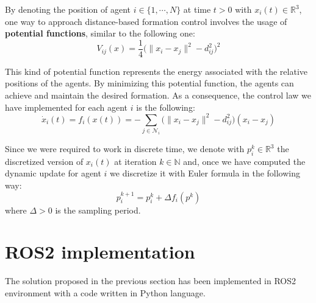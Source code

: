 \documentclass[a4paper,11pt,oneside]{book}
\begin{document}
By denoting the position of agent $i \in \{1, \cdots, N\}$ at time $t>0$ with $x_i(t) \in \mathbb{R}^3$, one way to approach distance-based formation control involves the usage of \textbf{potential functions}, similar to the following one:
\begin{equation}
V_{ij}(x)  = \frac{1}{4} \bigg( \lVert x_i - x_j \rVert^2 - d_{ij}^2 \bigg)^2
\label{Formation_potential}
\end{equation}

This kind of potential function represents the energy associated with the relative positions of the agents. By minimizing this potential function, the agents can achieve and maintain the desired formation.
As a consequence, the control law we have implemented for each agent $i$ is the following:
\begin{equation}
\dot{x}_i(t) = f_i(x(t)) = - \sum_{j \in \mathcal{N}_i} \bigg( \lVert x_i - x_j \rVert^2 - d_{ij}^2 \bigg) (x_i - x_j )
\label{Dynamics_no_collision_avoidance}
\end{equation}

Since we were required to work in discrete time, we denote with $p_i^k \in \mathbb{R}^3$ the discretized version of $x_i(t)$ at iteration $k \in \mathbb{N}$ and, once we have computed the dynamic update for agent $i$ we discretize it with Euler formula in the following way:
\begin{equation}
p_i^{k+1} = p_i^{k} + \Delta f_i(p^k)
\end{equation}
where $\Delta > 0$ is the sampling period.

\section{ROS2 implementation}
The solution proposed in the previous section has been implemented in ROS2 environment with a code written in Python language.
\end{document}
